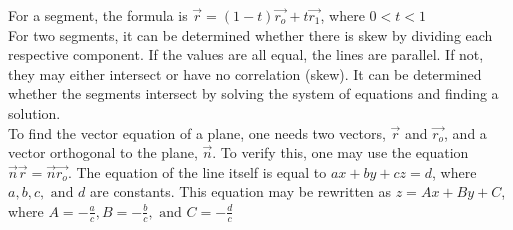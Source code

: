 \documentclass[12pt]{article}
\begin{document}
For a segment, the formula is $\vec{r} = (1-t)\vec{r_o} + t\vec{r_1}$, where $0<t<1$\\

For two segments, it can be determined whether there is skew by dividing each respective component. If the values are all equal, the lines are parallel. If not, they may either intersect or have no correlation (skew). It can be determined whether the segments intersect by solving the system of equations and finding a solution.\\

To find the vector equation of a plane, one needs two vectors, $\vec{r}$ and $\vec{r_o}$, and a vector orthogonal to the plane, $\vec{n}$. To verify this, one may use the equation $\vec{n}\vec{r}=\vec{n}\vec{r_o}$. The equation of the line itself is equal to $ax+by+cz=d$, where $a, b, c, \text{ and } d$ are constants. This equation may be rewritten as $z=Ax+ By + C$, where $A= -\frac{a}{c}, B= -\frac{b}{c}, \text{ and } C= -\frac{d}{c}$
\end{document}

